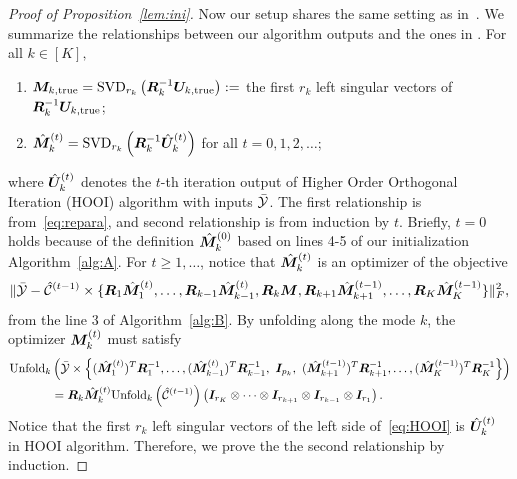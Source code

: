 \documentclass[12pt]{article}
\theoremstyle{definition}
\begin{document}
\begin{proof}[Proof of Proposition~\ref{lem:ini}]
Now our setup shares the same setting as in~\citet[Theorem 1]{zhang2018tensor}.
We summarize the relationships between our algorithm outputs and the ones in \cite{zhang2018tensor}. For all $k\in[K],$
\begin{enumerate}
    \item  $\bm M_{k,\text{true}} = \text{SVD}_{r_k}\left(\bm{R}_k^{-1}\bm{U}_{k,\text{true}}\right):=$  the first $r_k$ left singular vectors of $\bm{R}_k^{-1}\bm{U}_{k,\text{true}}$;
    \item $\hat{\bm M}_{k}^{(t)} = \text{SVD}_{r_k}\left(\bm{R}_k^{-1}\hat{\bm{U}}_{k}^{(t)}\right)$ for all $t=0,1,2,\ldots$;
\end{enumerate}
where $\hat {\bm{U}}^{(t)}_k$ denotes the $t$-th iteration output of Higher Order Orthogonal Iteration (HOOI) algorithm \citep{zhang2018tensor} with inputs $\bar {\mathcal{Y}}$. 
The first relationship is from~\eqref{eq:repara}, and second relationship is from induction by $t$. Briefly, $t=0$ holds because of the definition  $\hat{\bm M}^{(0)}_k$ based on lines 4-5 of our initialization Algorithm~\ref{alg:A}. For $t\geq 1,\ldots$, notice that $\hat{\bm M}_k^{(t)}$ is an optimizer of the objective \[\lVert\bar{\mathcal{Y}}-\hat{\mathcal{C}}^{(t-1)}\times\{\bm{R}_1\hat{\bm M}_1^{(t)},\ldots,\bm{R}_{k-1}\hat{\bm M}_{k-1}^{(t)},\bm{R}_k\bm M,\bm{R}_{k+1}\hat{\bm M}_{k+1}^{(t-1)},\ldots,\bm{R}_K\hat{\bm M}^{(t-1)}_K\}\rVert_F^2,\]
from the line 3 of  Algorithm~\ref{alg:B}. By unfolding along the mode $k$, the optimizer $\bm M_k^{(t)}$ must satisfy
\begin{align}\label{eq:HOOI}
    \text{Unfold}_k&\left(\bar\tY\times\left\{ (\hat\mM_1^{(t)})^T\mR_1^{-1},\ldots, (\hat\mM_{k-1}^{(t)})^T\mR_{k-1}^{-1},\ \mI_{p_k}, \ (\hat\mM_{k+1}^{(t-1)})^T\mR_{k+1}^{-1}, \ldots, (\hat\mM_{K}^{(t-1)})^T\mR_{K}^{-1}\right\} \right)\notag \\
    &=\mR_k\hat\mM_k^{(t)}\text{Unfold}_k\left(\hat\tC^{(t-1)}\right)\left(\mI_{r_K}\otimes\cdots\otimes\mI_{r_{k+1}}\otimes\mI_{r_{k-1}}\otimes \mI_{r_1}\right).
\end{align}
Notice that the first $r_k$ left singular vectors of the left side of~\eqref{eq:HOOI} is $\hat{\bm{U}}^{(t)}_k$ in HOOI algorithm. Therefore, we prove the  the second relationship by induction.




\end{proof}
\end{document}
